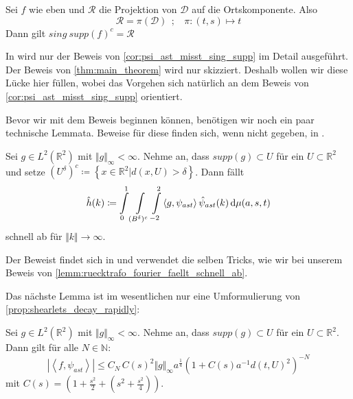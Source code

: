 \begin{corollary}
\label{cor:psi_ast_misst_sing_supp}
Sei $f$ wie eben und $\mathcal{R}$ die Projektion von $\mathcal{D}$ auf die  Ortskomponente. Also
\begin{equation*}
    \mathcal{R} = \pi (\mathcal{D})~~;~~~~
    \pi : (t,s) \mapsto t
\end{equation*}
Dann gilt $sing ~supp (f)^c = \mathcal{R}$
\end{corollary}

In \cite{Kutyniok2008} wird nur der Beweis von \cref{cor:psi_ast_misst_sing_supp} im Detail ausgeführt. Der Beweis von \cref{thm:main_theorem} wird nur skizziert. Deshalb wollen wir diese Lücke hier füllen, wobei das Vorgehen sich natürlich an dem Beweis von \cref{cor:psi_ast_misst_sing_supp} orientiert.

Bevor wir mit dem Beweis beginnen können, benötigen wir noch ein paar technische Lemmata. Beweise für diese finden sich, wenn nicht gegeben, in \cite{Kutyniok2008}.

\begin{lemma}
\label{lemm:lemma54}
    Sei $g \in L^2(\mathbb{R}^2)$ mit $\Vert g\Vert_\infty < \infty$. Nehme an, dass $supp (g) \subset U$ für ein $U \subset \mathbb{R}^2$ und setze
    $(U^\delta)^c \coloneqq \left\{x \in \mathbb{R}^2 | d(x,U) > \delta\right\}$.
    Dann fällt
    \begin{equation*}
        \hat h(k) \coloneqq \int \limits_0^1 \int \limits_{(B^\delta)^c} \int \limits_{-2}^{2} \left<g,\psi_{ast}\right> \hat \psi_{ast}(k) \mathop{}\!\mathrm{d} \mu (a,s,t)
    \end{equation*}
    schnell ab für $\Vert k \Vert \to \infty$.
\end{lemma}

Der Beweist findet sich in \cite{Kutyniok2008} und verwendet die selben Tricks, wie wir bei unserem Beweis von \cref{lemm:ruecktrafo_fourier_faellt_schnell_ab}.

Das nächste Lemma ist im wesentlichen nur eine Umformulierung von \cref{prop:shearlets_decay_rapidly}:

\begin{lemma}
\label{lemm:lemma52}
    Sei $g \in L^2(\mathbb{R}^2)$ mit $\Vert g\Vert_\infty < \infty$. Nehme an, dass $supp (g) \subset U$ für ein $U \subset \mathbb{R}^2$.
    Dann gilt für alle \(N \in \mathbb{N}\):
    \begin{equation*}
    |\left\langle f, \psi_{ast}\right\rangle| \leq C_N\, C(s)^2 \Vert g\Vert_\infty a^{\frac{1}{4}} \left(1+C(s) a^{-1} d(t,U)^2\right)^{-N}
    \end{equation*}
    mit \( C(s) = \left(1+\frac{s^2}{2} + \left(s^2+\frac{s^2}{4}\right)\right)\).
\end{lemma}

